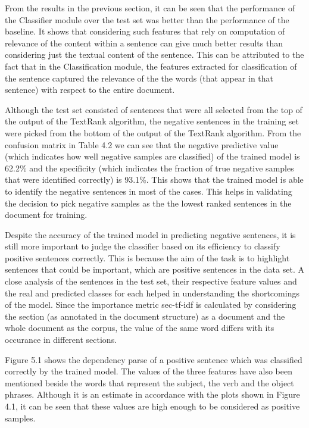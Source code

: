 From the results in the previous section, it can be seen that the performance of the Classifier module over the test set was better than the performance of the baseline.
It shows that considering such features that rely on computation of relevance of the content within a sentence can give much better results than considering just the textual content of the sentence.
This can be attributed to the fact that in the Classification module, the features extracted for classification of the sentence captured the relevance of the the words (that appear in that sentence) with respect to the entire document.

Although the test set consisted of sentences that were all selected from the top of the output of the TextRank algorithm, the negative sentences in the training set were picked from the bottom of the output of the TextRank algorithm.
From the confusion matrix in Table 4.2 we can see that the negative predictive value (which indicates how well negative samples are classified) of the trained model is 62.2\% and the specificity (which indicates the fraction of true negative samples that were identified correctly) is 93.1\%.
This shows that the trained model is able to identify the negative sentences in most of the cases.
This helps in validating the decision to pick negative samples as the the lowest ranked sentences in the document for training.

Despite the accuracy of the trained model in predicting negative sentences, it is still more important to judge the classifier based on its efficiency to classify positive sentences correctly.
This is because the aim of the task is to highlight sentences that could be important, which are positive sentences in the data set.
A close analysis of the sentences in the test set, their respective feature values and the real and predicted classes for each helped in understanding the shortcomings of the model.
Since the importance metric sec-tf-idf is calculated by considering the section (as annotated in the document structure) as a document and the whole document as the corpus, the value of the same word differs with its occurance in different sections.

Figure 5.1 shows the dependency parse of a positive sentence which was classified correctly by the trained model.
The values of the three features have also been mentioned beside the words that represent the subject, the verb and the object phrases.
Although it is an estimate in accordance with the plots shown in Figure 4.1, it can be seen that these values are high enough to be considered as positive samples.

